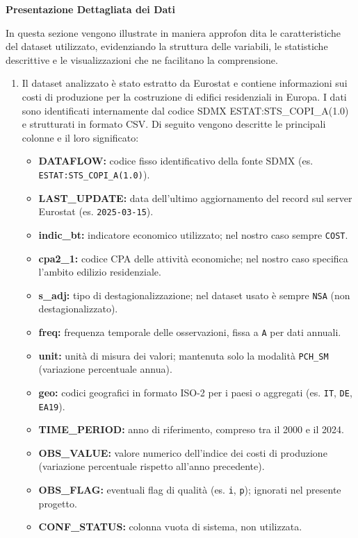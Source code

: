 \documentclass[conference]{IEEEtran}
\begin{document}
\vspace{1em}
{\Large\bfseries Presentazione Dettagliata dei Dati}
\vspace{0.5em}
     
     In questa sezione vengono illustrate in maniera approfon
dita le caratteristiche del dataset utilizzato, evidenziando la
 struttura delle variabili, le statistiche descrittive e le visualizzazioni che ne facilitano la comprensione.
\begin{enumerate}
    \item 

Il dataset analizzato è stato estratto da Eurostat e contiene informazioni sui costi di produzione per la costruzione di edifici residenziali in Europa. I dati sono identificati internamente dal codice SDMX ESTAT:STS_COPI_A(1.0) e strutturati in formato CSV. Di seguito vengono descritte le principali colonne e il loro significato:

\begin{itemize} \item \textbf{DATAFLOW:} codice fisso identificativo della fonte SDMX (es. \texttt{ESTAT:STS\_COPI\_A(1.0)}). \item \textbf{LAST\_UPDATE:} data dell’ultimo aggiornamento del record sul server Eurostat (es. \texttt{2025-03-15}). \item \textbf{indic\_bt:} indicatore economico utilizzato; nel nostro caso sempre \texttt{COST}. \item \textbf{cpa2\_1:} codice CPA delle attività economiche; nel nostro caso specifica l’ambito edilizio residenziale. \item \textbf{s\_adj:} tipo di destagionalizzazione; nel dataset usato è sempre \texttt{NSA} (non destagionalizzato). \item \textbf{freq:} frequenza temporale delle osservazioni, fissa a \texttt{A} per dati annuali. \item \textbf{unit:} unità di misura dei valori; mantenuta solo la modalità \texttt{PCH\_SM} (variazione percentuale annua). \item \textbf{geo:} codici geografici in formato ISO-2 per i paesi o aggregati (es. \texttt{IT}, \texttt{DE}, \texttt{EA19}). \item \textbf{TIME\_PERIOD:} anno di riferimento, compreso tra il 2000 e il 2024. \item \textbf{OBS\_VALUE:} valore numerico dell’indice dei costi di produzione (variazione percentuale rispetto all’anno precedente). \item \textbf{OBS\_FLAG:} eventuali flag di qualità (es. \texttt{i}, \texttt{p}); ignorati nel presente progetto. \item \textbf{CONF\_STATUS:} colonna vuota di sistema, non utilizzata. \end{itemize}


\end{enumerate}
\end{document}
